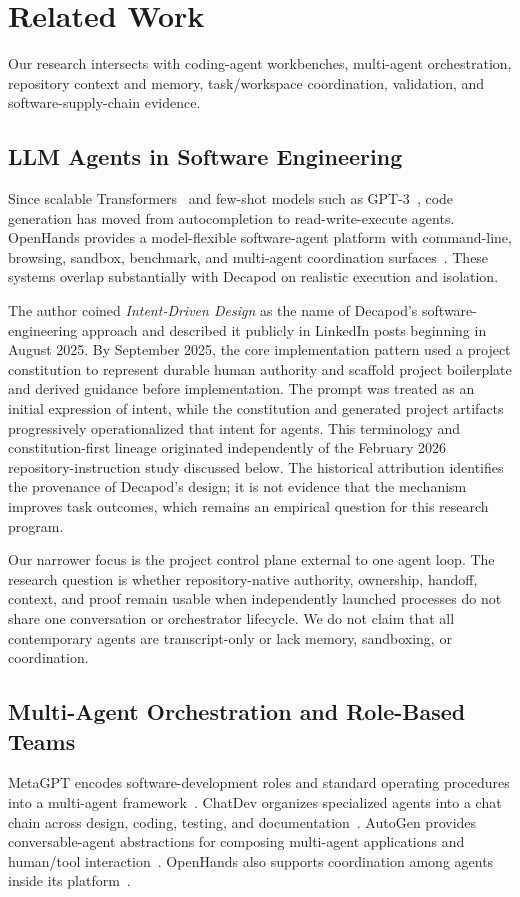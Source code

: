 \section{Related Work}
\label{sec:relatedwork}

Our research intersects with coding-agent workbenches, multi-agent orchestration, repository context and memory, task/workspace coordination, validation, and software-supply-chain evidence.

\subsection{LLM Agents in Software Engineering}
Since scalable Transformers~\cite{vaswani2017attention} and few-shot models such as GPT-3~\cite{brown2020language}, code generation has moved from autocompletion to read-write-execute agents. OpenHands provides a model-flexible software-agent platform with command-line, browsing, sandbox, benchmark, and multi-agent coordination surfaces~\cite{wang2024openhands}. These systems overlap substantially with Decapod on realistic execution and isolation.

The author coined \emph{Intent-Driven Design} as the name of Decapod's software-engineering approach and described it publicly in LinkedIn posts beginning in August 2025. By September 2025, the core implementation pattern used a project constitution to represent durable human authority and scaffold project boilerplate and derived guidance before implementation. The prompt was treated as an initial expression of intent, while the constitution and generated project artifacts progressively operationalized that intent for agents. This terminology and constitution-first lineage originated independently of the February 2026 repository-instruction study discussed below. The historical attribution identifies the provenance of Decapod's design; it is not evidence that the mechanism improves task outcomes, which remains an empirical question for this research program.

Our narrower focus is the project control plane external to one agent loop. The research question is whether repository-native authority, ownership, handoff, context, and proof remain usable when independently launched processes do not share one conversation or orchestrator lifecycle. We do not claim that all contemporary agents are transcript-only or lack memory, sandboxing, or coordination.

\subsection{Multi-Agent Orchestration and Role-Based Teams}
MetaGPT encodes software-development roles and standard operating procedures into a multi-agent framework~\cite{hong2023metagpt}. ChatDev organizes specialized agents into a chat chain across design, coding, testing, and documentation~\cite{qian2024chatdev}. AutoGen provides conversable-agent abstractions for composing multi-agent applications and human/tool interaction~\cite{wu2023autogen}. OpenHands also supports coordination among agents inside its platform~\cite{wang2024openhands}.

